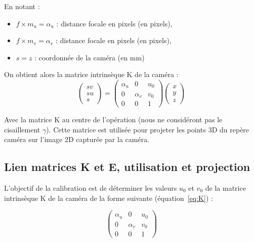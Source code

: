 \documentclass[12pt]{article}
\begin{document}
En notant :
\begin{itemize}
    \item $f \times m_{u} = \alpha_u$ : distance focale en pixels (en pixels),
    \item $f \times m_{v} = \alpha_v$ : distance focale en pixels (en pixels),
    \item $s = z$ : coordonnée de la caméra (en mm)
\end{itemize}

On obtient alors la matrice intrinsèque K de la caméra :
\begin{equation}
    \begin{pmatrix}
    sv \\
    su \\
    s
    \end{pmatrix} = 
    \begin{pmatrix}
    \alpha_u & 0 & u_0 \\
    0 & \alpha_v & v_0 \\
    0 & 0 & 1
    \end{pmatrix}
    \begin{pmatrix}
    x \\
    y \\
    z
    \end{pmatrix}
\end{equation}

Avec la matrice K au centre de l'opération (nous ne considéront pas le cisaillement $\gamma$).
Cette matrice est utilisée pour projeter les points 3D du repère caméra sur l'image 2D capturée par la caméra.

\subsection{Lien matrices K et E, utilisation et projection}

L'objectif de la calibration est de déterminer les valeurs $u_0$ et $v_0$ de la matrice intrinsèque K de la caméra de la forme suivante \cite{frenchidrone}\cite{wikipedia_calibration_camera} (équation~\ref{eq:K}) :

\begin{equation}
\begin{pmatrix}
\alpha_{u} & 0 & u_0 \\
0 & \alpha_{v} & v_0 \\
0 & 0 & 1
\end{pmatrix}
\label{eq:K}
\end{equation}
\end{document}
